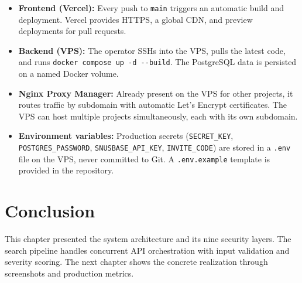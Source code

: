 \begin{itemize}[nosep]
  \item \textbf{Frontend (Vercel):} Every push to \texttt{main} triggers an
        automatic build and deployment. Vercel provides HTTPS, a global CDN,
        and preview deployments for pull requests.
  \item \textbf{Backend (VPS):} The operator SSHs into the VPS, pulls the
        latest code, and runs \texttt{docker compose up -d -{}-build}. The
        PostgreSQL data is persisted on a named Docker volume.
  \item \textbf{Nginx Proxy Manager:} Already present on the VPS for other
        projects, it routes traffic by subdomain with automatic Let's Encrypt
        certificates. The VPS can host multiple projects simultaneously, each
        with its own subdomain.
  \item \textbf{Environment variables:} Production secrets (\texttt{SECRET\_KEY},
        \texttt{POSTGRES\_PASSWORD}, \texttt{SNUSBASE\_API\_KEY},
        \texttt{INVITE\_CODE}) are stored in a \texttt{.env} file on the VPS,
        never committed to Git. A \texttt{.env.example} template is provided
        in the repository.
\end{itemize}

\section*{Conclusion}

This chapter presented the system architecture and its nine security layers.
The search pipeline handles concurrent API orchestration with input validation
and severity scoring. The next chapter shows the concrete realization through
screenshots and production metrics.
